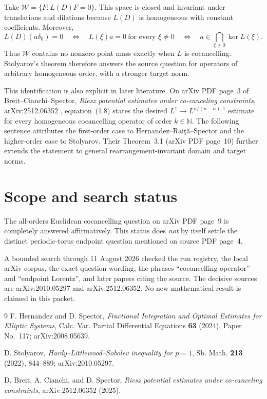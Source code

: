 \documentclass[11pt]{article}
\begin{document}
Take $\mathcal W=\{F:L(D)F=0\}$.  This space is closed and invariant under
translations and dilations because $L(D)$ is homogeneous with constant
coefficients.  Moreover,
\[
 L(D)(a\delta_0)=0
 \quad\Longleftrightarrow\quad
 L(\xi)a=0\ \text{for every }\xi\ne0
 \quad\Longleftrightarrow\quad
 a\in\bigcap_{\xi\ne0}\ker L(\xi).
\]
Thus $\mathcal W$ contains no nonzero point mass exactly when $L$ is
cocancelling.  Stolyarov's theorem therefore answers the source question
for operators of arbitrary homogeneous order, with a stronger target norm.

This identification is also explicit in later literature.  On arXiv PDF
page~3 of Breit--Cianchi--Spector,
\emph{Riesz potential estimates under co-canceling constraints},
arXiv:2512.06352 \cite{bcs}, equation~(1.8) states the desired
$L^1\to L^{n/(n-\alpha),1}$ estimate for every homogeneous cocancelling
operator of order $k\in\mathbb N$.  The following sentence attributes the
first-order case to Hernandez--Rai\c{t}\u{a}--Spector and the higher-order
case to Stolyarov.  Their Theorem~3.1 (arXiv PDF page~10) further extends
the statement to general rearrangement-invariant domain and target norms.

\section{Scope and search status}

The all-orders Euclidean cocancelling question on arXiv PDF page~9 is
completely answered affirmatively.  This status does \emph{not} by itself
settle the distinct periodic-torus endpoint question mentioned on source
PDF page~4.

A bounded search through 11 August 2026 checked the run registry, the local
arXiv corpus, the exact question wording, the phrases ``cocancelling
operator'' and ``endpoint Lorentz'', and later papers citing the source.
The decisive sources are arXiv:2010.05297 and arXiv:2512.06352.  No new
mathematical result is claimed in this packet.

\begin{thebibliography}{9}
F. Hernandez and D. Spector,
\emph{Fractional Integration and Optimal Estimates for Elliptic Systems},
Calc. Var. Partial Differential Equations \textbf{63} (2024), Paper No.~117;
arXiv:2008.05639.

D. Stolyarov,
\emph{Hardy--Littlewood--Sobolev inequality for $p=1$},
Sb. Math. \textbf{213} (2022), 844--889;
arXiv:2010.05297.

D. Breit, A. Cianchi, and D. Spector,
\emph{Riesz potential estimates under co-canceling constraints},
arXiv:2512.06352 (2025).
\end{thebibliography}
\end{document}
